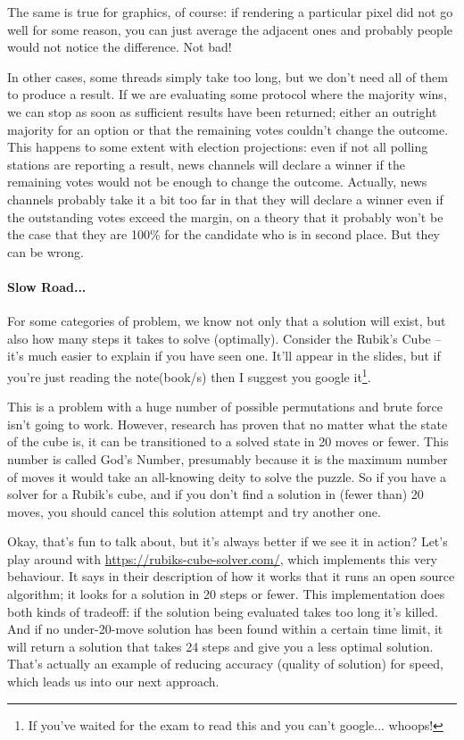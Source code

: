 \documentclass[a4paper]{report}
\begin{document}
The same is true for graphics, of course: if rendering a particular pixel did
not go well for some reason, you can just average the adjacent ones and probably
people would not notice the difference. Not bad!

In other cases, some threads simply take too long, but we don't need all of them to produce a result. If we are evaluating some protocol where the majority wins, we can stop as soon as sufficient results have been returned; either an outright majority for an option or that the remaining votes couldn't change the outcome. This happens to some extent with election projections: even if not all polling stations are reporting a result, news channels will declare a winner if the remaining votes would not be enough to change the outcome. Actually, news channels probably take it a bit too far in that they will declare a winner even if the outstanding votes exceed the margin, on a theory that it probably won't be the case that they are 100\% for the candidate who is in second place. But they can be wrong.

\paragraph{Slow Road...}
For some categories of problem, we know not only that a solution will exist, but also how many steps it takes to solve (optimally). Consider the Rubik's Cube -- it's much easier to explain if you have seen one. It'll appear in the slides, but if you're just reading the note(book/s) then I suggest you google it\footnote{If you've waited for the exam to read this and you can't google... whoops!}.

This is a problem with a huge number of possible permutations and brute force isn't going to work. However, research has proven that no matter what the state of the cube is, it can be transitioned to a solved state in 20 moves or fewer. This number is called God's Number, presumably because it is the maximum number of moves it would take an all-knowing deity to solve the puzzle. So if you have a solver for a Rubik's cube, and if you don't find a solution in (fewer than) 20 moves, you should cancel this solution attempt and try another one.

Okay, that's fun to talk about, but it's always better if we see it in action? Let's play around with \url{https://rubiks-cube-solver.com/}, which implements this very behaviour. It says in their description of how it works that it runs an open source algorithm; it looks for a solution in 20 steps or fewer. This implementation does both kinds of tradeoff: if the solution being evaluated takes too long it's killed. And if no under-20-move solution has been found within a certain time limit, it will return a solution that takes 24 steps and give you a less optimal solution. That's actually an example of reducing accuracy (quality of solution) for speed, which leads us into our next approach.
\end{document}
